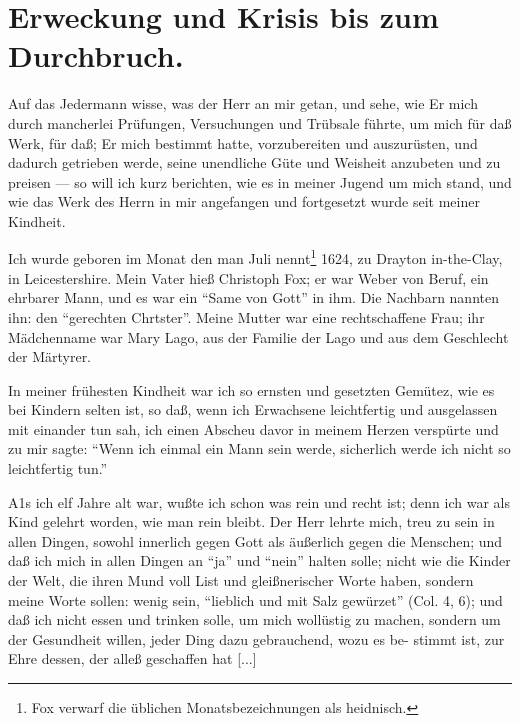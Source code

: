 \section{Erweckung und Krisis bis zum Durchbruch.}



Auf das Jedermann wisse, was der Herr an mir getan, und
sehe, wie Er mich durch mancherlei Prüfungen, Versuchungen und
Trübsale führte, um mich für daß Werk, für daß; Er mich bestimmt 
hatte, vorzubereiten und auszurüsten, und dadurch getrieben 
werde, seine unendliche Güte und Weisheit anzubeten und
zu preisen — so will ich kurz berichten, wie es in meiner Jugend
um mich stand, und wie das Werk des Herrn in mir angefangen
und fortgesetzt wurde seit meiner Kindheit.

Ich wurde geboren im Monat den man Juli nennt\footnote{Fox 
verwarf die üblichen Monatsbezeichnungen als heidnisch.} 1624,
zu Drayton in-the-Clay, in Leicestershire. Mein Vater hieß
Christoph Fox; er war Weber von Beruf, ein ehrbarer Mann,
und es war ein "`Same von Gott"' in ihm. Die Nachbarn
nannten ihn: den "`gerechten Chrtster"'. Meine Mutter war eine
rechtschaffene Frau; ihr Mädchenname war Mary Lago, aus der
Familie der Lago und aus dem Geschlecht der Märtyrer.

In meiner frühesten Kindheit war ich so ernsten und gesetzten
Gemütez, wie es bei Kindern selten ist, so daß, wenn ich Erwachsene 
leichtfertig und ausgelassen mit einander tun sah, ich
einen Abscheu davor in meinem Herzen verspürte und zu mir
sagte: "`Wenn ich einmal ein Mann sein werde, sicherlich werde
ich nicht so leichtfertig tun."'

A1s ich elf Jahre alt war, wußte ich schon was rein und
recht ist; denn ich war als Kind gelehrt worden, wie man rein
bleibt. Der Herr lehrte mich, treu zu sein in allen Dingen, sowohl
innerlich gegen Gott als äußerlich gegen die Menschen; und daß
ich mich in allen Dingen an "`ja"' und "`nein"' halten solle; nicht
wie die Kinder der Welt, die ihren Mund voll List und gleißnerischer
Worte haben, sondern meine Worte sollen: wenig sein, "`lieblich
und mit Salz gewürzet"' (Col. 4, 6); und daß ich nicht essen
und trinken solle, um mich wollüstig zu machen, sondern um der
Gesundheit willen, jeder Ding dazu gebrauchend, wozu es be-
stimmt ist, zur Ehre dessen, der alleß geschaffen hat [...]

